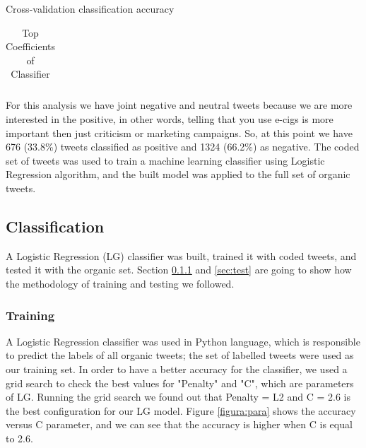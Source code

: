 \documentclass{sig-alternate}
\begin{document}
\begin{table}[t]
\caption{Cross-validation classification accuracy \label{tab:measure}}
\centering

\end{table}

\begin{table}[t]
\centering
\caption{Top Coefficients of Classifier}
\label{tab:coef}
\begin{tabular}{|r|p{14cm}| }
\hline

\end{tabular}
\end{table}

 
For this analysis we have joint negative and neutral tweets because we are more interested in the positive, in other words, telling that you use e-cigs is more important then just criticism or marketing campaigns. So, at this point we have 676 (33.8\%) tweets classified as positive and 1324 (66.2\%) as negative. The coded set of tweets was used to train a machine learning classifier using Logistic Regression algorithm, and the built model was applied to the full set of organic tweets.


\subsection{Classification}

A Logistic Regression (LG) classifier was built, trained it with coded tweets, and tested it with the organic set. Section \ref{sec:train} and \ref{sec:test} are going to show how the methodology of training and testing we followed.

\subsubsection{Training}
\label{sec:train}

A Logistic Regression classifier was used in Python language, which is responsible to predict the labels of all organic tweets; the set of labelled tweets were used as our training set. In order to have a better accuracy for the classifier, we used a grid search to check the best values for "Penalty" and "C", which are parameters of LG. Running the grid search we found out that Penalty = L2 and C = 2.6 is the best configuration for our LG model. Figure \ref{figura:para} shows the accuracy versus C parameter, and we can see that the accuracy is higher when C is equal to 2.6.

\end{document}
